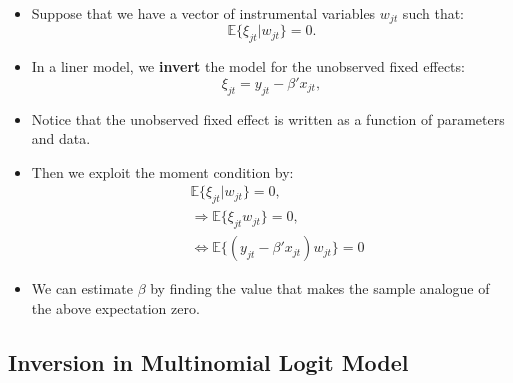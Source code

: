 \documentclass[
]{book}
\providecommand{\tightlist}{%
  \setlength{\itemsep}{0pt}\setlength{\parskip}{0pt}}
\begin{document}
\begin{itemize}
\tightlist
\item
  Suppose that we have a vector of instrumental variables \(w_{jt}\) such that:
  \begin{equation}
  \mathbb{E}\{\xi_{jt}|w_{jt}\} = 0.
  \end{equation}
\item
  In a liner model, we \textbf{invert} the model for the unobserved fixed effects:
  \begin{equation}
  \xi_{jt} = y_{jt} - \beta'x_{jt},
  \end{equation}
\item
  Notice that the unobserved fixed effect is written as a function of parameters and data.
\item
  Then we exploit the moment condition by:
  \begin{equation}
  \begin{split}
  &\mathbb{E}\{\xi_{jt}|w_{jt}\} = 0,\\
  &\Rightarrow \mathbb{E}\{ \xi_{jt} w_{jt}\} = 0,\\
  &\Leftrightarrow \mathbb{E}\{(y_{jt} - \beta'x_{jt}) w_{jt} \} = 0
  \end{split}
  \end{equation}
\item
  We can estimate \(\beta\) by finding the value that makes the sample analogue of the above expectation zero.
\end{itemize}

\hypertarget{inversion-in-multinomial-logit-model}{%
\subsection{Inversion in Multinomial Logit Model}\label{inversion-in-multinomial-logit-model}}
\end{document}

